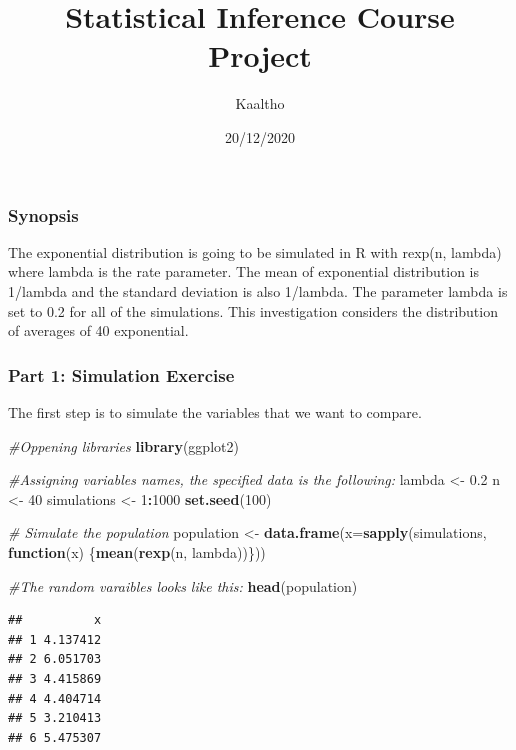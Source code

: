 \documentclass[
]{article}
\title{Statistical Inference Course Project}
\author{Kaaltho}
\date{20/12/2020}
\newenvironment{Shaded}{\begin{snugshade}}{\end{snugshade}}
\newcommand{\CommentTok}[1]{\textcolor[rgb]{0.56,0.35,0.01}{\textit{#1}}}
\newcommand{\ControlFlowTok}[1]{\textcolor[rgb]{0.13,0.29,0.53}{\textbf{#1}}}
\newcommand{\DataTypeTok}[1]{\textcolor[rgb]{0.13,0.29,0.53}{#1}}
\newcommand{\DecValTok}[1]{\textcolor[rgb]{0.00,0.00,0.81}{#1}}
\newcommand{\FloatTok}[1]{\textcolor[rgb]{0.00,0.00,0.81}{#1}}
\newcommand{\KeywordTok}[1]{\textcolor[rgb]{0.13,0.29,0.53}{\textbf{#1}}}
\newcommand{\NormalTok}[1]{#1}
\newcommand{\OperatorTok}[1]{\textcolor[rgb]{0.81,0.36,0.00}{\textbf{#1}}}
\newcommand{\StringTok}[1]{\textcolor[rgb]{0.31,0.60,0.02}{#1}}
\begin{document}
\maketitle

\hypertarget{synopsis}{%
\subsubsection{Synopsis}\label{synopsis}}

The exponential distribution is going to be simulated in R with rexp(n,
lambda) where lambda is the rate parameter. The mean of exponential
distribution is 1/lambda and the standard deviation is also 1/lambda.
The parameter lambda is set to 0.2 for all of the simulations. This
investigation considers the distribution of averages of 40 exponential.

\hypertarget{part-1-simulation-exercise}{%
\subsubsection{\texorpdfstring{\textbf{Part 1: Simulation
Exercise}}{Part 1: Simulation Exercise}}\label{part-1-simulation-exercise}}

The first step is to simulate the variables that we want to compare.

\begin{Shaded}
\begin{Highlighting}[]
\CommentTok{#Oppening libraries}
\KeywordTok{library}\NormalTok{(ggplot2)}

\CommentTok{#Assigning variables names, the specified data is the following:}
\NormalTok{lambda <-}\StringTok{ }\FloatTok{0.2}
\NormalTok{n <-}\StringTok{ }\DecValTok{40}
\NormalTok{simulations <-}\StringTok{ }\DecValTok{1}\OperatorTok{:}\DecValTok{1000}
\KeywordTok{set.seed}\NormalTok{(}\DecValTok{100}\NormalTok{)}

\CommentTok{# Simulate the population}
\NormalTok{population <-}\StringTok{ }\KeywordTok{data.frame}\NormalTok{(}\DataTypeTok{x=}\KeywordTok{sapply}\NormalTok{(simulations, }\ControlFlowTok{function}\NormalTok{(x) \{}\KeywordTok{mean}\NormalTok{(}\KeywordTok{rexp}\NormalTok{(n, lambda))\}))}

\CommentTok{#The random varaibles looks like this:}
\KeywordTok{head}\NormalTok{(population)}
\end{Highlighting}
\end{Shaded}

\begin{verbatim}
##          x
## 1 4.137412
## 2 6.051703
## 3 4.415869
## 4 4.404714
## 5 3.210413
## 6 5.475307
\end{verbatim}
\end{document}
